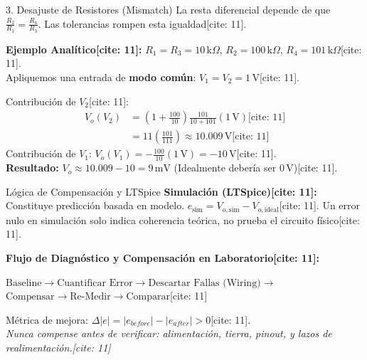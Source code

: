 \documentclass[aspectratio=169, xcolor={table,xcdraw}]{beamer}
\begin{document}
\begin{frame}{3. Desajuste de Resistores (Mismatch)}
    La resta diferencial depende de que $\frac{R_2}{R_1} = \frac{R_4}{R_3}$. Las tolerancias rompen esta igualdad[cite: 11].
    
    \textbf{Ejemplo Analítico[cite: 11]:}
    $R_1=R_3=10\,\text{k}\Omega$, $R_2=100\,\text{k}\Omega$, \textbf{$R_4=101\,\text{k}\Omega$}[cite: 11]. \\
    Apliquemos una entrada de \textbf{modo común}: $V_1=V_2=1\,\text{V}$[cite: 11].
    
    Contribución de $V_2$[cite: 11]: 
    \begin{align*}
        V_o(V_2) &= \left(1+\frac{100}{10}\right)\frac{101}{10+101}(1\,\text{V}) \text{[cite: 11]} \\
                 &= 11\left(\frac{101}{111}\right) \approx 10.009\,\text{V} \text{[cite: 11]}
    \end{align*}
    Contribución de $V_1$: $V_o(V_1) = -\frac{100}{10}(1\,\text{V}) = -10\,\text{V}$[cite: 11]. \\
    \textbf{Resultado:} $V_o \approx 10.009 - 10 = \boxed{9\,\text{mV}}$ (Idealmente debería ser $0\,\text{V}$)[cite: 11].
\end{frame}

\begin{frame}{Lógica de Compensación y LTSpice}
    \textbf{Simulación (LTSpice)[cite: 11]:} \\
    Constituye predicción basada en modelo. $e_{\mathrm{sim}} = V_{o,\mathrm{sim}} - V_{o,\mathrm{ideal}}$[cite: 11]. Un error nulo en simulación solo indica coherencia teórica, no prueba el circuito físico[cite: 11].
    
    \vspace{0.4cm}
    \textbf{Flujo de Diagnóstico y Compensación en Laboratorio[cite: 11]:}
    \begin{center}
        $\boxed{\text{Baseline}} \rightarrow \boxed{\text{Cuantificar Error}} \rightarrow \boxed{\text{Descartar Fallas (Wiring)}} \rightarrow$ \\ $\boxed{\text{Compensar}} \rightarrow \boxed{\text{Re-Medir}} \rightarrow \boxed{\text{Comparar}}$[cite: 11]
    \end{center}
    
    Métrica de mejora: $\Delta |e| = |e_{before}| - |e_{after}| > 0$[cite: 11]. \\
    \textit{Nunca compense antes de verificar: alimentación, tierra, pinout, y lazos de realimentación.[cite: 11]}
\end{frame}
\end{document}
